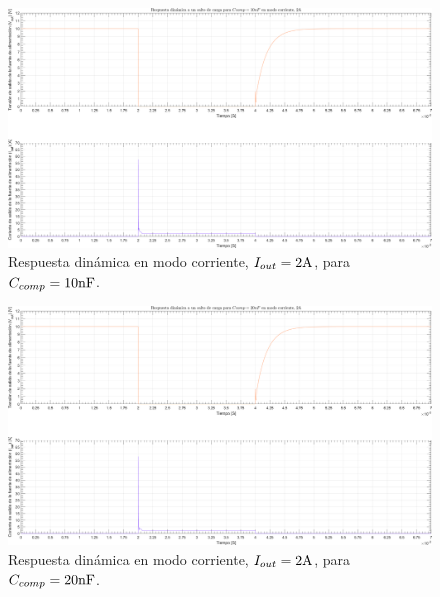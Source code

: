 \clearpage

\begin{figure}[H] %
\begin{center}
\includegraphics[width=1.1 \textwidth, angle=90]{./img/plots/dynamic/power_supply_CCOMP_10n_STEP_Modo3.png}
\caption{\label{fig:fig_power_supply_CCOMP_STEP_10n_Modo3}\footnotesize{Respuesta dinámica en modo corriente, $I_{out} = 2 \si[per-mode=symbol]{\ampere}$, para $C_{comp} = 10 \si[per-mode=symbol]{\nano\farad} $.}}
\end{center}
\end{figure}

\clearpage

\begin{figure}[H] %
\begin{center}
\includegraphics[width=1.1 \textwidth, angle=90]{./img/plots/dynamic/power_supply_CCOMP_20n_STEP_Modo3.png}
\caption{\label{fig:fig_power_supply_CCOMP_STEP_20n_Modo3}\footnotesize{Respuesta dinámica en modo corriente, $I_{out} = 2 \si[per-mode=symbol]{\ampere}$, para $C_{comp} = 20 \si[per-mode=symbol]{\nano\farad} $.}}
\end{center}
\end{figure}

